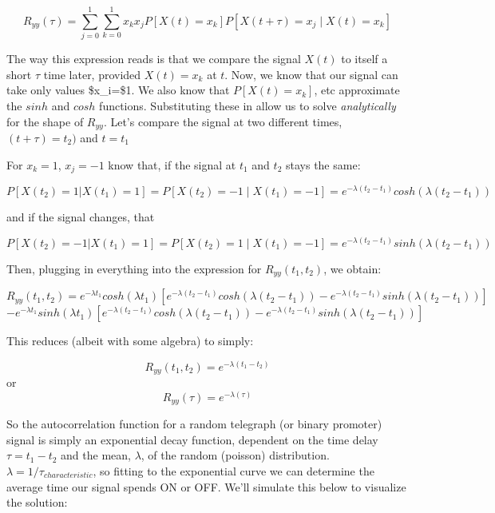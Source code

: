 \documentclass[11pt]{article}
\begin{document}
\[ R_{yy}(\tau) = \sum_{j=0}^{1} {}\sum_{k=0}^{1} {x_k x_j P[X(t)=x_k]P[X(t+\tau) = x_j\mid X(t) = x_k]} \]

    The way this expression reads is that we compare the signal \(X(t)\) to
itself a short \(\tau\) time later, provided \(X(t) = x_k\) at \(t\).
Now, we know that our signal can take only values \$x\_i=\pm\$1. We also
know that \(P[X(t)=x_k]\), etc approximate the \(sinh\) and \(cosh\)
functions. Substituting these in allow us to solve \emph{analytically}
for the shape of \(R_{yy}\). Let's compare the signal at two different
times, \((t+\tau)=t_2)\) and \(t=t_1\)

    For \(x_k=1\), \(x_j=-1\) know that, if the signal at \(t_1\) and
\(t_2\) stays the same:

\[ P[X(t_2)=1|X(t_1)=1] = P[X(t_2)=-1\mid X(t_1)=-1] = e^{-\lambda (t_2 - t_1) }cosh(\lambda(t_2 - t_1))    \]

and if the signal changes, that

\[ P[X(t_2)=-1|X(t_1)=1] = P[X(t_2)=1\mid X(t_1)=-1] =  e^{-\lambda (t_2 - t_1) }sinh(\lambda(t_2 - t_1)) \]

    Then, plugging in everything into the expression for
\(R_{yy}(t_1, t_2)\), we obtain:

\[ R_{yy}(t_1, t_2) =  e^{-\lambda t_1}cosh(\lambda t_1) [e^{-\lambda (t_2 - t_1) }cosh(\lambda(t_2 - t_1)) - e^{-\lambda (t_2 - t_1) }sinh(\lambda(t_2 - t_1))] \]
\[- e^{-\lambda t_1}sinh(\lambda t_1) [e^{-\lambda (t_2 - t_1) }cosh(\lambda(t_2 - t_1)) - e^{-\lambda (t_2 - t_1) }sinh(\lambda(t_2 - t_1))]    \]

    This reduces (albeit with some algebra) to simply:

\[ R_{yy}(t_1, t_2) = e^{-\lambda (t_1-t_2)}\] or
\[ R_{yy}(\tau) = e^{-\lambda (\tau)} \]

So the autocorrelation function for a random telegraph (or binary
promoter) signal is simply an exponential decay function, dependent on
the time delay \(\tau = t_1 - t_2\) and the mean, \(\lambda\), of the
random (poisson) distribution. \(\lambda=1/\tau_{characteristic}\), so
fitting to the exponential curve we can determine the average time our
signal spends ON or OFF. We'll simulate this below to visualize the
solution:
\end{document}
